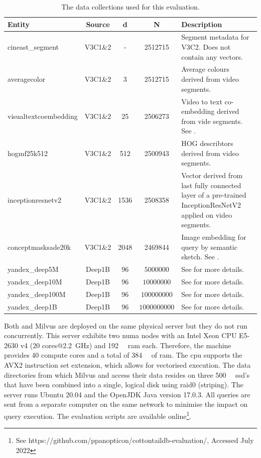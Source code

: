 \begin{table}
    \begin{tabular}{ | l | c | c | c | p{5cm} |}
        \hline
        \textbf{Entity} & \textbf{Source} & \textbf{d} & \textbf{N} & \textbf{Description} \\
        \hline
        \hline
        cineast\_segment & V3C1\&2  & - & 2512715 & Segment metadata for V3C2. Does not contain any vectors. \\ 
        \hline
        averagecolor & V3C1\&2  & 3 & 2512715 & Average colours derived from video segments. \\ 
        \hline
        visualtextcoembedding & V3C1\&2 & 25 & 2506273 & Video to text co-embedding derived from vide segments. See \cite{Spiess:2021Competitive}. \\
        \hline
        hogmf25k512  & V3C1\&2  & 512 & 2500943 & HOG \cite{Bay:2006surf} describtors derived from video segments. \\
        \hline
        inceptionresnetv2 & V3C1\&2  & 1536 & 2508358 & Vector derived from last fully connected layer of a pre-trained InceptionResNetV2 applied on video segments.\\
        \hline
        conceptmasksade20k & V3C1\&2 & 2048 & 2469844 & Image embedding for query by semantic sketch. See \cite{Rossetto:2019Query}. \\
        \hline
        yandex\_deep5M  & Deep1B  & 96 & $5000000$ & See \cite{Babenko:2016Efficient} for more details. \\
        \hline
        yandex\_deep10M  & Deep1B & 96 & $10000000$ & See \cite{Babenko:2016Efficient} for more details. \\
        \hline
        yandex\_deep100M  & Deep1B & 96 & $100000000$ & See \cite{Babenko:2016Efficient} for more details. \\
        \hline
        yandex\_deep1B  & Deep1B & 96 & $1000000000$ & See \cite{Babenko:2016Efficient} for more details. \\
        \hline
        \hline
    \end{tabular}
    \caption{The data collections used for this evaluation. }
    \label{table:datasets}
\end{table}

Both \cottontail{} and Milvus are deployed on the same physical server but they do not run concurrently. This server exhibits two \acrshort{numa} nodes with an Intel Xeon CPU E5-2630 v4 (20 cores@\SI{2.2}{\giga\hertz}) and \SI{192}{\giga\byte} \acrshort{ram} each. Therefore, the machine provides 40 compute cores and a total of \SI{384}{\giga\byte} of \acrshort{ram}. The \acrshort{cpu} supports the AVX2 instruction set extension, which allows for vectorised execution. The data directories from which Milvus and \cottontail{} access their data resides on three \SI{500}{\giga\byte} \acrshort{ssd}'s that have been combined into a single, logical disk using \acrshort{raid}0 (striping). The server runs Ubuntu 20.04 and the OpenJDK Java version 17.0.3. All queries are sent from a separate computer on the same network to minimise the impact on query execution. The evaluation scripts are available online\footnote{See https://github.com/ppanopticon/cottontaildb-evaluation/, Accessed July 2022}.

